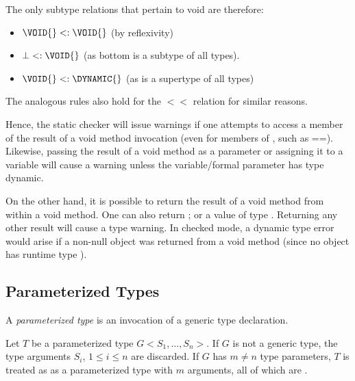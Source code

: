 \documentclass{article}
\newcommand{\code}[1]{{\sf #1}}
\begin{document}
\begin{itemize}
{The only subtype relations that pertain to void are therefore:
\begin{itemize}
\item
$\VOID{} <: \VOID{}$ (by reflexivity)
\item
$\bot <: \VOID{}$ (as bottom is a subtype of all types).
\item
$\VOID{} <:   \DYNAMIC{}$ (as  \DYNAMIC{} is a supertype of all types)
\end{itemize}

The analogous rules also hold for the $<<$ relation for  similar reasons.

Hence, the static checker will issue warnings if one attempts to access a member of the result of a void method invocation (even for members of \NULL{}, such as \code{==}).  Likewise, passing the result of a void method as a parameter or assigning it to a variable will cause a warning unless the variable/formal parameter has type dynamic.

On the other hand, it is possible to return the result of a void method from within a void method. One can also return \NULL{}; or a value of type \DYNAMIC{}. Returning any other result will cause a type warning. In checked mode, a dynamic type error would arise if a non-null object was returned from a void method (since no object has runtime type  \DYNAMIC{}).
}





\subsection{Parameterized Types}

\LMHash{}
A {\em parameterized type} is an invocation of a generic type declaration.

\LMHash{}
Let $T$ be a parameterized type  $G<S_1,  \ldots, S_n>$. If $G$ is not a generic type, the type arguments $S_i$, $1 \le i \le n$ are discarded. If $G$ has $m \ne n$ type parameters, $T$ is treated as as a parameterized type with $m$ arguments, all of which are \DYNAMIC{}.



\end{itemize}
\end{document}
